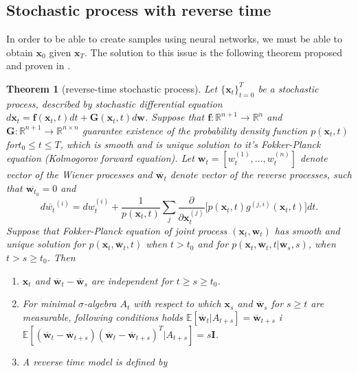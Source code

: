 \documentclass[10pt]{article}
\newtheorem{Twierdzenie}{Theorem}[section]
\begin{document}
\subsection{Stochastic process with reverse time}
In order to be able to create samples using neural networks, we must be able to obtain 
$\textbf{x}_0$ given $\textbf{x}_T$. The solution to this issue is the following theorem proposed and proven in  \cite{reverse_time_SDE}.
\begin{Twierdzenie}[reverse-time stochastic process]
Let $\{ \textbf{x}_t\}_{t=0}^T$ be a stochastic process, described by stochastic differential equation
$d\textbf{x}_t =  \textbf{f}(\textbf{x}_t, t) dt +  \textbf{G}(\textbf{x}_t, t)d\textbf{w}$. Suppose that $ \textbf{f}: \mathbb{R}^{n + 1} \to \mathbb{R}^n $ and $ \textbf{G}: \mathbb{R}^{n + 1} \to \mathbb{R}^{n \times n} $ guarantee existence of the probability density function $p(\textbf{x}_t, t)$ for$t_0 \leq t \leq T$,
which is smooth and is unique solution to it's Fokker-Planck equation (Kolmogorov forward equation). Let $\textbf{w}_t = [w_t^{(1)}, ... , w_t^{(n)}]$ denote vector of the Wiener processes  and $\overline{\textbf{w}_t}$ denote vector of the reverse processes, such that   $\overline{\textbf{w}_{t_0}} = 0 $ and
\begin{equation}
    d\overline{w_t}^{(i)} =
    dw_t^{(i)} + \frac{1}{p(\textbf{x}_t, t)}  \sum_{j} \frac{\partial}{\partial \textbf{x}_t^{(j)}} \Big[p(\textbf{x}_t , t)  g^{(j,i)}(\textbf{x}_t , t) \Big]dt.
\end{equation}
Suppose that Fokker-Planck equation of joint process $(\textbf{x}_t,\textbf{w}_t )$ has smooth and unique solution for $p(\textbf{x}_t,\overline{\textbf{w}}_t, t )$ when $t > t_0$ and for 
$p(\textbf{x}_t,\overline{\textbf{w}}_t, t | \overline{\textbf{w}}_s, s)$, when $t > s \geq t_0$. Then
\begin{enumerate}
    \item $\textbf{x}_t$ and $\overline{\textbf{w}}_t - \overline{\textbf{w}}_s$ are independent for $t \geq s \geq t_0$.
    \item For minimal $\sigma$-algebra $A_t$ with respect to which $\textbf{x}_s$ and  $\overline{\textbf{w}}_s$ for $s \geq t $  are measurable, following conditions holds $\mathbb{E}[\overline{\textbf{w}}_t | A_{t+s}] = \overline{\textbf{w}}_{t+s}$ i \\ $\mathbb{E}[(\overline{\textbf{w}}_t -  \overline{\textbf{w}}_{t+s})(\overline{\textbf{w}}_t -  \overline{\textbf{w}}_{t+s})^T| A_{t+s}] = s\mathbf{I}$.
    \item A reverse time model is defined by 

\end{enumerate}
\end{Twierdzenie}
\end{document}
